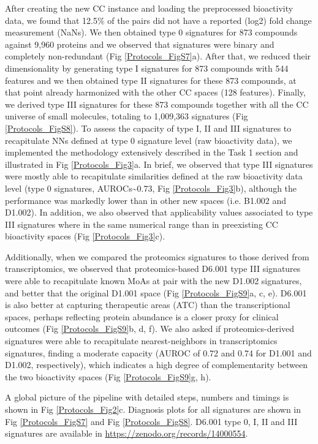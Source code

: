 After creating the new CC instance and loading the preprocessed bioactivity data, we found that 12.5\% of the pairs did not have a reported (log2) fold change measurement (NaNs). We then obtained type 0 signatures for 873 compounds against 9,960 proteins and we observed that signatures were binary and completely non-redundant (Fig \ref{Protocols_FigS7}a). After that, we reduced their dimensionality by generating type I signatures for 873 compounds with 544 features and we then obtained type II signatures for these 873 compounds, at that point already harmonized with the other CC spaces (128 features). Finally, we derived type III signatures for these 873 compounds together with all the CC universe of small molecules, totaling to 1,009,363 signatures (Fig \ref{Protocols_FigS8}). To assess the capacity of type I, II and III signatures to recapitulate NNs defined at type 0 signature level (raw bioactivity data), we implemented the methodology extensively described in the Task 1 section and illustrated in Fig \ref{Protocols_Fig3}a. In brief, we observed that type III signatures were mostly able to recapitulate similarities defined at the raw bioactivity data level (type 0 signatures, AUROCs\textasciitilde0.73, Fig \ref{Protocols_Fig3}b), although the performance was markedly lower than in other new spaces (i.e. B1.002 and D1.002). In addition, we also observed that applicability values associated to type III signatures where in the same numerical range than in preexisting CC bioactivity spaces (Fig \ref{Protocols_Fig3}c).


Additionally, when we compared the proteomics signatures to those derived from transcriptomics, we observed that proteomics-based D6.001 type III signatures were able to recapitulate known MoAs at pair with the new D1.002 signatures, and better that the original D1.001 space (Fig \ref{Protocols_FigS9}a, c, e). D6.001 is also better at capturing therapeutic areas (ATC) than the transcriptional spaces, perhaps reflecting protein abundance is a closer proxy for clinical outcomes (Fig \ref{Protocols_FigS9}b, d, f). We also asked if proteomics-derived signatures were able to recapitulate nearest-neighbors in transcriptomics signatures, finding a moderate capacity (AUROC of 0.72 and 0.74 for D1.001 and D1.002, respectively), which indicates a high degree of complementarity between the two bioactivity spaces (Fig \ref{Protocols_FigS9}g, h).

A global picture of the pipeline with detailed steps, numbers and timings is shown in Fig \ref{Protocols_Fig2}c. Diagnosis plots for all signatures are shown in Fig \ref{Protocols_FigS7} and Fig \ref{Protocols_FigS8}. D6.001 type 0, I, II and III signatures are available in \hyperlink{https://zenodo.org/records/14000554}{https://zenodo.org/records/14000554}. 

